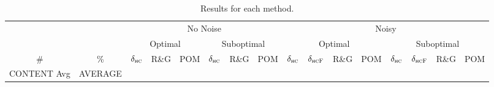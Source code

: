 \documentclass[letterpaper]{article}
\newcommand{\hdeltahc}{\ensuremath{\delta_{\textsc{hc}}}}
\newcommand{\hdeltahcf}{\ensuremath{\delta_{\textsc{hcF}}}}
\newcommand{\completion}{POM}
\newcommand{\rg}{R\&G}
\begin{document}
\begin{table*}[]
\centering
\fontsize{5}{6}\selectfont
\setlength\tabcolsep{1.5pt}
\begin{tabular}{cc|ccc|ccc|cccc|cccc}
\toprule
 & & \multicolumn{6}{c}{No Noise} & \multicolumn{8}{c}{Noisy}\\
\cmidrule(lr){3-8}\cmidrule(lr){9-16}
 & & \multicolumn{3}{c}{Optimal} & \multicolumn{3}{c}{Suboptimal} & \multicolumn{4}{c}{Optimal} & \multicolumn{4}{c}{Suboptimal}\\
\cmidrule(lr){3-5}\cmidrule(lr){6-8}\cmidrule(lr){9-12}\cmidrule(lr){13-16}
\# & \% & \hdeltahc & \rg & \completion & \hdeltahc & \rg & \completion%
& \hdeltahc & \hdeltahcf & \rg & \completion & \hdeltahc & \hdeltahcf & \rg & \completion\\
\midrule
CONTENT
Avg & AVERAGE\\
\bottomrule
\end{tabular}\\
\caption{Results for each method.}
\end{table*}
\end{document}
